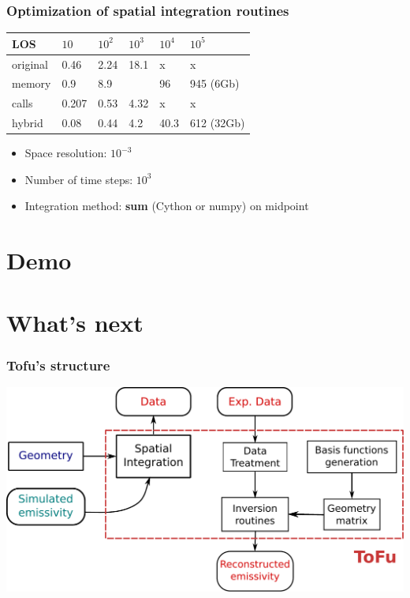 \documentclass[10pt]{beamer}
\begin{document}
\begin{frame}
\frametitle{Optimization of spatial integration routines}

\begin{table}[h] %
    \centering
    \label{tab:LOS_init_sirrah}
     \begin{tabular}{@{}llllll@{}}
       \toprule
       \textbf{LOS} &  {$10$} & {$10^2$} & {$10^3$} & {$10^4$} & {$10^5$}\\
       \midrule
       original       & 0.46 & 2.24 & 18.1 & x & x \\
       memory   & 0.9 & 8.9 &  & 96 & 945 (6Gb)\\
       calls   & 0.207 & 0.53 & 4.32 & x & x \\
       hybrid & 0.08 & 0.44 & 4.2 & 40.3 & 612 (32Gb)\\
       \bottomrule
     \end{tabular}
\end{table}

  \vspace{-0.2cm}
    \begin{itemize}
  \item Space resolution: $10^{-3}$
  \item Number of time steps: $10^3$
  \item Integration method: \textbf{sum} (Cython or numpy) on midpoint
  \end{itemize}
  \end{frame}

\section{Demo}

\section{What's next}


\begin{frame}
\frametitle{Tofu's structure}

\begin{center}
    	\includegraphics[width=0.8\linewidth]{figures/tofu.pdf}
\end{center}
	
\end{frame}
\end{document}
